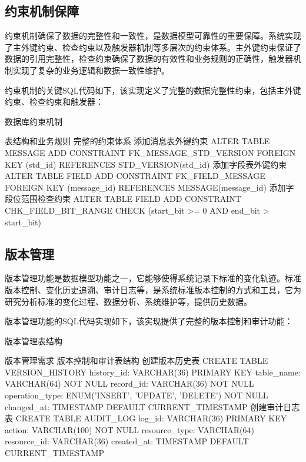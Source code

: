 \subsection{约束机制保障}

约束机制确保了数据的完整性和一致性，是数据模型可靠性的重要保障。系统实现了主外键约束、检查约束以及触发器机制等多层次的约束体系。主外键约束保证了数据的引用完整性，检查约束确保了数据的有效性和业务规则的正确性，触发器机制实现了复杂的业务逻辑和数据一致性维护。

约束机制的关键SQL代码如下，该实现定义了完整的数据完整性约束，包括主外键约束、检查约束和触发器：

\begin{algorithm}[H]
\caption{数据库约束机制}
\begin{algorithmic}[1]
\REQUIRE 表结构和业务规则
\ENSURE 完整的约束体系
\STATE 添加消息表外键约束
\STATE ALTER TABLE MESSAGE
\STATE ADD CONSTRAINT FK\_MESSAGE\_STD\_VERSION
\STATE FOREIGN KEY (std\_id) REFERENCES STD\_VERSION(std\_id)
\STATE 添加字段表外键约束
\STATE ALTER TABLE FIELD
\STATE ADD CONSTRAINT FK\_FIELD\_MESSAGE
\STATE FOREIGN KEY (message\_id) REFERENCES MESSAGE(message\_id)
\STATE 添加字段位范围检查约束
\STATE ALTER TABLE FIELD
\STATE ADD CONSTRAINT CHK\_FIELD\_BIT\_RANGE
\STATE CHECK (start\_bit >= 0 AND end\_bit > start\_bit)
\end{algorithmic}
\end{algorithm}
\subsection{版本管理}
版本管理功能是数据模型功能之一，它能够使得系统记录下标准的变化轨迹。标准版本控制、变化历史追溯、审计日志等，是系统标准版本控制的方式和工具，它为研究分析标准的变化过程、数据分析、系统维护等，提供历史数据。

版本管理功能的SQL代码实现如下，该实现提供了完整的版本控制和审计功能：

\begin{algorithm}[H]
\caption{版本管理表结构}
\begin{algorithmic}[1]
\REQUIRE 版本管理需求
\ENSURE 版本控制和审计表结构
\STATE 创建版本历史表
\STATE CREATE TABLE VERSION\_HISTORY
\STATE history\_id: VARCHAR(36) PRIMARY KEY
\STATE table\_name: VARCHAR(64) NOT NULL
\STATE record\_id: VARCHAR(36) NOT NULL
\STATE operation\_type: ENUM('INSERT', 'UPDATE', 'DELETE') NOT NULL
\STATE changed\_at: TIMESTAMP DEFAULT CURRENT\_TIMESTAMP
\STATE 创建审计日志表
\STATE CREATE TABLE AUDIT\_LOG
\STATE log\_id: VARCHAR(36) PRIMARY KEY
\STATE action: VARCHAR(100) NOT NULL
\STATE resource\_type: VARCHAR(64)
\STATE resource\_id: VARCHAR(36)
\STATE created\_at: TIMESTAMP DEFAULT CURRENT\_TIMESTAMP
\end{algorithmic}
\end{algorithm}




